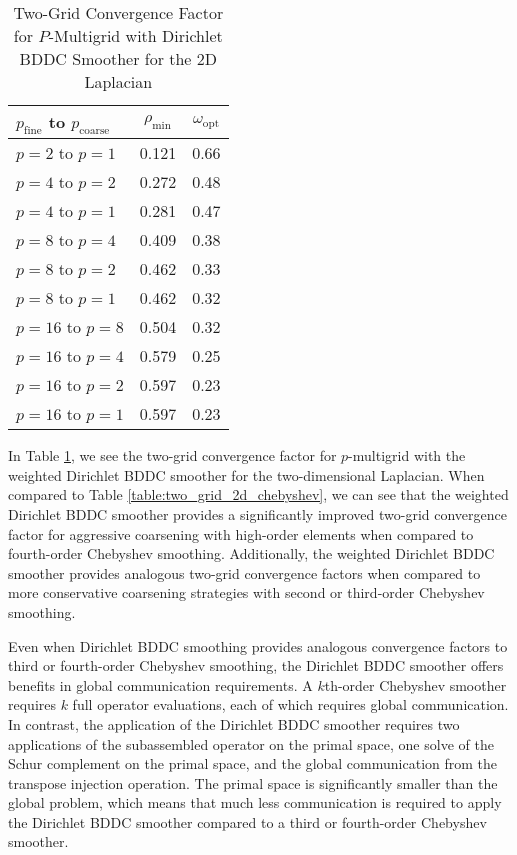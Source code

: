 \begin{table}[ht!]
\begin{center}
\begin{tabular}{l cc}
  \toprule
  $p_{\text{fine}}$ to $p_{\text{coarse}}$  & $\rho_{\min}$ & $\omega_{\text{opt}}$  \\
  \toprule
  $p = 2$ to $p = 1$   &  0.121 & 0.66  \\
  \midrule
  $p = 4$ to $p = 2$   &  0.272 & 0.48  \\
  $p = 4$ to $p = 1$   &  0.281 & 0.47  \\
  \midrule
  $p = 8$ to $p = 4$   &  0.409 & 0.38  \\
  $p = 8$ to $p = 2$   &  0.462 & 0.33  \\
  $p = 8$ to $p = 1$   &  0.462 & 0.32  \\
  \midrule
  $p = 16$ to $p = 8$  &  0.504 & 0.32  \\
  $p = 16$ to $p = 4$  &  0.579 & 0.25  \\
  $p = 16$ to $p = 2$  &  0.597 & 0.23  \\
  $p = 16$ to $p = 1$  &  0.597 & 0.23  \\
  \bottomrule
\end{tabular}
\end{center}
\caption{Two-Grid Convergence Factor for $P$-Multigrid with Dirichlet BDDC Smoother for the 2D Laplacian}
\label{table:two_grid_bddc_smoother}
\end{table}

In Table \ref{table:two_grid_bddc_smoother}, we see the two-grid convergence factor for $p$-multigrid with the weighted Dirichlet BDDC smoother for the two-dimensional Laplacian.
When compared to Table \ref{table:two_grid_2d_chebyshev}, we can see that the weighted Dirichlet BDDC smoother provides a significantly improved two-grid convergence factor for aggressive coarsening with high-order elements when compared to fourth-order Chebyshev smoothing.
Additionally, the weighted Dirichlet BDDC smoother provides analogous two-grid convergence factors when compared to more conservative coarsening strategies with second or third-order Chebyshev smoothing.

Even when Dirichlet BDDC smoothing provides analogous convergence factors to third or fourth-order Chebyshev smoothing, the Dirichlet BDDC smoother offers benefits in global communication requirements.
A $k$th-order Chebyshev smoother requires $k$ full operator evaluations, each of which requires global communication.
In contrast, the application of the Dirichlet BDDC smoother requires two applications of the subassembled operator on the primal space, one solve of the Schur complement on the primal space, and the global communication from the transpose injection operation.
The primal space is significantly smaller than the global problem, which means that much less communication is required to apply the Dirichlet BDDC smoother compared to a third or fourth-order Chebyshev smoother.

